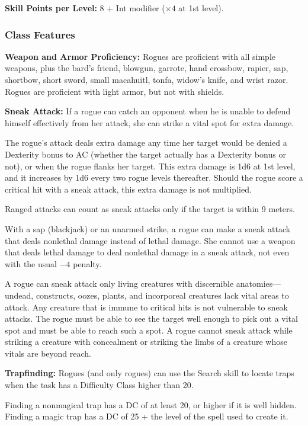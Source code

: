 \textbf{Skill Points per Level:} 8 + Int modifier ($\times4$ at 1st level).

\subsubsection{Class Features}
\textbf{Weapon and Armor Proficiency:} Rogues are proficient with all simple weapons, plus the bard's friend, blowgun, garrote, hand crossbow, rapier, sap, shortbow, short sword, small macahuitl, tonfa, widow's knife, and wrist razor. Rogues are proficient with light armor, but not with shields.

\textbf{Sneak Attack:} If a rogue can catch an opponent when he is unable to defend himself effectively from her attack, she can strike a vital spot for extra damage.

The rogue's attack deals extra damage any time her target would be denied a Dexterity bonus to AC (whether the target actually has a Dexterity bonus or not), or when the rogue flanks her target. This extra damage is 1d6 at 1st level, and it increases by 1d6 every two rogue levels thereafter. Should the rogue score a critical hit with a sneak attack, this extra damage is not multiplied.

Ranged attacks can count as sneak attacks only if the target is within 9 meters.

With a sap (blackjack) or an unarmed strike, a rogue can make a sneak attack that deals nonlethal damage instead of lethal damage. She cannot use a weapon that deals lethal damage to deal nonlethal damage in a sneak attack, not even with the usual $-4$ penalty.

A rogue can sneak attack only living creatures with discernible anatomies---undead, constructs, oozes, plants, and incorporeal creatures lack vital areas to attack. Any creature that is immune to critical hits is not vulnerable to sneak attacks. The rogue must be able to see the target well enough to pick out a vital spot and must be able to reach such a spot. A rogue cannot sneak attack while striking a creature with concealment or striking the limbs of a creature whose vitals are beyond reach.

\textbf{Trapfinding:} Rogues (and only rogues) can use the Search skill to locate traps when the task has a Difficulty Class higher than 20.

Finding a nonmagical trap has a DC of at least 20, or higher if it is well hidden. Finding a magic trap has a DC of 25 + the level of the spell used to create it.

